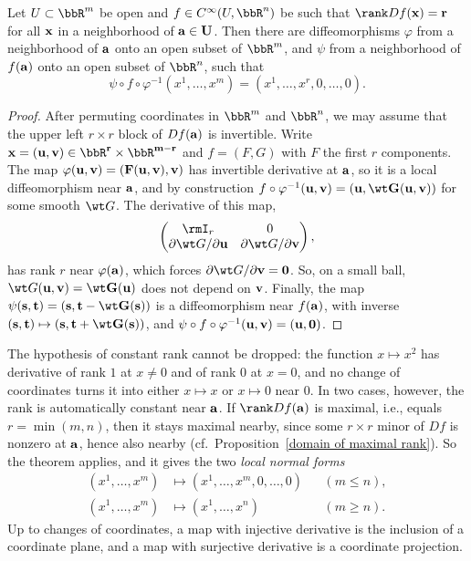 \begin{thm}\label{thm constant rank Rn}
    Let $U\subset\bbR^m$ be open and $f\in C^\infty(U,\bbR^n)$ be such that $\rank Df(\bf{x})=r$ for all $\bf{x}$ in a neighborhood of $\bf{a}\in U$. Then there are diffeomorphisms $\varphi$ from a neighborhood of $\bf{a}$ onto an open subset of $\bbR^m$, and $\psi$ from a neighborhood of $f(\bf{a})$ onto an open subset of $\bbR^n$, such that
    \[\psi\circ f\circ\varphi^{-1}(x^1,\ldots,x^m)=(x^1,\ldots,x^r,0,\ldots,0).\]
\end{thm}
\begin{proof}
    After permuting coordinates in $\bbR^m$ and $\bbR^n$, we may assume that the upper left $r\times r$ block of $Df(\bf{a})$ is invertible. Write $\bf{x}=(\bf{u},\bf{v})\in\bbR^r\times\bbR^{m-r}$ and $f=(F,G)$ with $F$ the first $r$ components. The map $\varphi(\bf{u},\bf{v})=(F(\bf{u},\bf{v}),\bf{v})$ has invertible derivative at $\bf{a}$, so it is a local diffeomorphism near $\bf{a}$, and by construction $f\circ\varphi^{-1}(\bf{u},\bf{v})=(\bf{u},\wt G(\bf{u},\bf{v}))$ for some smooth $\wt G$. The derivative of this map,
    \[\begin{pmatrix}\rmI_r&0\\ \partial\wt G/\partial\bf{u}&\partial\wt G/\partial\bf{v}\end{pmatrix},\]
    has rank $r$ near $\varphi(\bf{a})$, which forces $\partial\wt G/\partial\bf{v}=0$. So, on a small ball, $\wt G(\bf{u},\bf{v})=\wt G(\bf{u})$ does not depend on $\bf{v}$. Finally, the map $\psi(\bf{s},\bf{t})=(\bf{s},\bf{t}-\wt G(\bf{s}))$ is a diffeomorphism near $f(\bf{a})$, with inverse $(\bf{s},\bf{t})\mapsto(\bf{s},\bf{t}+\wt G(\bf{s}))$, and $\psi\circ f\circ\varphi^{-1}(\bf{u},\bf{v})=(\bf{u},0)$.
\end{proof}

The hypothesis of constant rank cannot be dropped: the function $x\mapsto x^2$ has derivative of rank $1$ at $x\neq0$ and of rank $0$ at $x=0$, and no change of coordinates turns it into either $x\mapsto x$ or $x\mapsto0$ near $0$. In two cases, however, the rank is automatically constant near $\bf{a}$. If $\rank Df(\bf{a})$ is maximal, i.e., equals $r=\min(m,n)$, then it stays maximal nearby, since some $r\times r$ minor of $Df$ is nonzero at $\bf{a}$, hence also nearby (cf.\ Proposition~\ref{domain of maximal rank}). So the theorem applies, and it gives the two \emph{local normal forms}
\[\begin{aligned}
    (x^1,\ldots,x^m)&\mapsto(x^1,\ldots,x^m,0,\ldots,0)&&(m\leq n),\\
    (x^1,\ldots,x^m)&\mapsto(x^1,\ldots,x^n)&&(m\geq n).
\end{aligned}\]
Up to changes of coordinates, a map with injective derivative is the inclusion of a coordinate plane, and a map with surjective derivative is a coordinate projection.

